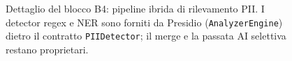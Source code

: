 \begin{figure}[htbp]
	\caption[Dettaglio del blocco B4: pipeline ibrida di rilevamento PII]{Dettaglio del blocco B4: pipeline ibrida di rilevamento PII. I detector regex e NER sono forniti da Presidio (\texttt{AnalyzerEngine}) dietro il contratto \texttt{PIIDetector}; il merge e la passata AI selettiva restano proprietari.}
	\label{fig:b4-detection-pipeline}
\end{figure}

